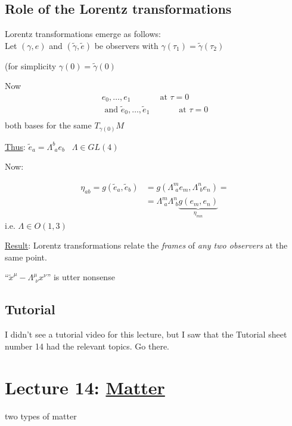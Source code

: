 	\subsection{Role of the Lorentz transformations}
	
	Lorentz transformations emerge as follows: \\
	Let $(\gamma,e)$ and $(\widetilde{\gamma},\widetilde{e})$ be observers with $\gamma(\tau_1) = \widetilde{\gamma}(\tau_2)$
	
	(for simplicity $\gamma(0) = \widetilde{\gamma}(0)$
	
	Now 
	\[
	\begin{gathered}
	e_0 , \dots , e_1 \quad \quad \quad \, \text{ at } \tau = 0 \\
	\text{ and } 
	\widetilde{e}_0 , \dots , \widetilde{e}_1 \quad \quad \quad \, \text{ at }  \tau = 0 \\
	\end{gathered}
	\]
	both bases for the same $T_{\gamma(0)}M$
	
	\underline{Thus}: $\widetilde{e}_a = \Lambda^b_{ \, \, a} e_b $ \quad \quad \, $\Lambda \in GL(4)$
	
	Now:
	
	\[
	\begin{aligned}
	\eta_{ab} = g(\widetilde{e}_a, \widetilde{e}_b) & = g(\Lambda^m_{ \, \, a}e_m, \Lambda^n_{ \, \, b} e_n ) = \\
	& = \Lambda^m_{ \, \, a} \Lambda^n_{ \, \, b} \underbrace{g(e_m,e_n)}_{ \eta_{mn}}
	\end{aligned}
	\]
	i.e. $\Lambda \in O(1,3)$
	
	\underline{Result}: Lorentz transformations relate the \emph{frames} of \emph{any two observers} at the same point.
	
	``$\widetilde{x}^{\mu} - \Lambda^{\mu}_{ \, \, \nu} x^{\nu}$'' is utter nonsense
	
	\subsection*{Tutorial}
	
	I didn't see a tutorial video for this lecture, but I saw that the Tutorial sheet number 14 had the relevant topics.  Go there.
	
	\section{Lecture 14: \underline{Matter}}
	
	two types of matter
	
